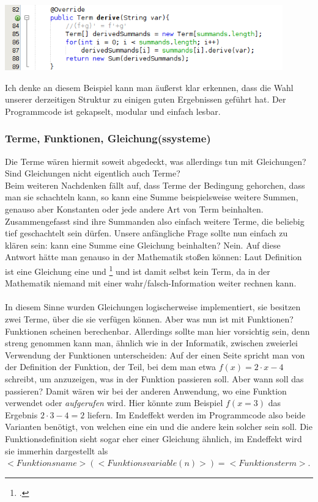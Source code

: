 \begin{center}
\includegraphics[width=0.9\textwidth]{img/sachsenschnitzel/code_Sum_derive_cropped}
\end{center}
\noindent
Ich denke an diesem Beispiel kann man äußerst klar erkennen, dass die Wahl unserer derzeitigen Struktur zu einigen guten Ergebnissen geführt hat. Der Programmcode ist gekapselt, modular und einfach lesbar.

\subsubsection{Terme, Funktionen, Gleichung(ssysteme)}
Die Terme wären hiermit soweit abgedeckt, was allerdings tun mit Gleichungen? Sind Gleichungen nicht eigentlich auch Terme?\\
Beim weiteren Nachdenken fällt auf, dass Terme der Bedingung gehorchen, dass man sie schachteln kann, so kann eine Summe beispielsweise weitere Summen, genauso aber Konstanten oder jede andere Art von Term beinhalten. Zusammengefasst sind ihre Summanden also einfach weitere Terme, die beliebig tief geschachtelt sein dürfen. Unsere anfängliche Frage sollte nun einfach zu klären sein: kann eine Summe eine Gleichung beinhalten? Nein. Auf diese Antwort hätte man genauso in der Mathematik stoßen können: Laut Definition ist eine Gleichung eine  und \footcite{math_gleichung} und ist damit selbst kein Term, da in der Mathematik niemand mit einer wahr/falsch-Information weiter rechnen kann.\\
\\
In diesem Sinne wurden Gleichungen logischerweise implementiert, sie besitzen zwei Terme, über die sie verfügen können. Aber was nun ist mit Funktionen? Funktionen scheinen berechenbar. Allerdings sollte man hier vorsichtig sein, denn streng genommen kann man, ähnlich wie in der Informatik, zwischen zweierlei Verwendung der Funktionen unterscheiden: Auf der einen Seite spricht man von der Definition der Funktion, der Teil, bei dem man etwa $f(x) = 2 \cdot x  - 4$ schreibt, um anzuzeigen, was in der Funktion passieren soll. Aber wann soll das passieren? Damit wären wir bei der anderen Anwendung, wo eine Funktion verwendet oder \textit{aufgerufen} wird. Hier könnte zum Beispiel $f(x=3)$ das Ergebnis $2 \cdot 3 - 4 = 2$ liefern. Im Endeffekt werden im Programmcode also beide Varianten benötigt, von welchen eine ein  und die andere kein solcher sein soll. Die Funktionsdefinition sieht sogar eher einer Gleichung ähnlich, im Endeffekt wird sie immerhin dargestellt als $<Funktionsname>(<Funktionsvariable(n)>)=<Funktionsterm>$.\\
